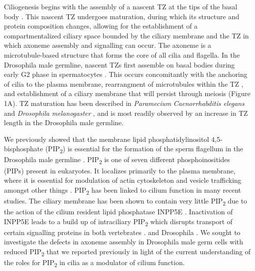 \documentclass[12pt, twoside, letterpaper]{article}
\newcommand{\PIP}{PIP\textsubscript{2}}
\begin{document}
\begin{doublespacing}
\begin{linenumbers}
    Ciliogenesis begins with the assembly of a nascent TZ at the tips of
    the basal body \citep{reiter2012base}.
    This nascent TZ undergoes maturation, during which its structure and protein
    composition changes, allowing for the
    establishment of a compartmentalized ciliary space bounded by the ciliary membrane
    and the TZ in which axoneme assembly and signalling can occur.
    The axoneme is a microtubule-based structure that forms the core of all cilia and flagella.
    In the Drosophila male germline, nascent TZs first assemble on basal bodies
    during early G2 phase in spermatocytes \citep{riparbelli2012assembly}.
    This occurs concomitantly with the anchoring of cilia to the plasma membrane,
    rearrangment of microtubules within the TZ \citep{gottardo2013cilium},
    and establishment of a
    ciliary membrane that will persist through meiosis
    \citep{riparbelli2012assembly} (Figure 1A).
    TZ maturation has been described in
    \textit{Paramecium} \citep{aubusson2015transition}
    \textit{Caenorrhabditis elegans} \citep{serwas2017centrioles} and
    \textit{Drosophila melanogaster} \citep{gottardo2013cilium},
    and is most readily observed by an increase in TZ length
    in the Drosophila male germline.

    We previously showed that the membrane lipid phosphatidylinositol 4,5-bisphosphate
    (\PIP{}) is essential for the formation of the sperm flagellum in the Drosophila
    male germline \citep{wei2008depletion, fabian2010phosphatidylinositol}.
    \PIP{} is one of seven different phosphoinositides (PIPs) present in eukaryotes.
    It localizes primarily to the plasma membrane, where it is essential for
    modulation of actin cytoskeleton and vesicle trafficking amongst other things
    \citep{balla2013phosphoinositides}.
    \PIP{} has been linked to cilium function in many recent studies.
    The ciliary membrane has been shown to contain very little \PIP{} due to the action
    of the cilium resident lipid phosphatase INPP5E \citep{nakatsu2015phosphoinositide}.
    Inactivation of INPP5E leads to a build up of intraciliary \PIP{}
    which disrupts transport of certain signalling proteins in both vertebrates
    \citep{chavez2015modulation, garcia2015phosphoinositides, conduit2017compartmentalized}.
    and Drosophila \citep{park2015ciliary}.
    We sought to investigate the defects in axoneme assembly in Drosophila male germ cells
    with reduced \PIP{} 
    that we reported previously in light of the current understanding of the roles
    for \PIP{} in cilia as a modulator of cilium function.


\end{linenumbers}
\end{doublespacing}
\end{document}
